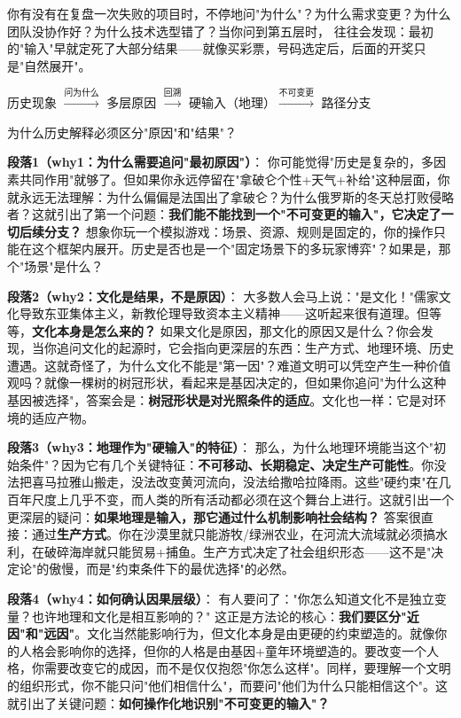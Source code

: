 \documentclass[../main.tex]{subfiles}
\begin{document}
	\begin{motivation}
				你有没有在复盘一次失败的项目时，不停地问"为什么"？为什么需求变更？为什么团队没协作好？为什么技术选型错了？当你问到第五层时，
		往往会发现：最初的"输入"早就定死了大部分结果——就像买彩票，号码选定后，后面的开奖只是"自然展开"。
	\end{motivation}
	
	\begin{logicmap}
		历史现象 $\xrightarrow{\text{问为什么}}$ 多层原因 $\xrightarrow{\text{回溯}}$ 硬输入（地理）$\xrightarrow{\text{不可变更}}$ 路径分支
	\end{logicmap}
	
	\begin{questionbox}
		为什么历史解释必须区分"原因"和"结果"？
	\end{questionbox}
	
	\textbf{段落1（why1：为什么需要追问"最初原因"）}：  
	你可能觉得"历史是复杂的，多因素共同作用"就够了。但如果你永远停留在"拿破仑个性+天气+补给"这种层面，你就永远无法理解：为什么偏偏是法国出了拿破仑？为什么俄罗斯的冬天总打败侵略者？这就引出了第一个问题：\textbf{我们能不能找到一个"不可变更的输入"，它决定了一切后续分支？} 想象你玩一个模拟游戏：场景、资源、规则是固定的，你的操作只能在这个框架内展开。历史是否也是一个"固定场景下的多玩家博弈"？如果是，那个"场景"是什么？
	
	\textbf{段落2（why2：文化是结果，不是原因）}：  
	大多数人会马上说："是文化！"儒家文化导致东亚集体主义，新教伦理导致资本主义精神——这听起来很有道理。但等等，\textbf{文化本身是怎么来的？} 如果文化是原因，那文化的原因又是什么？你会发现，当你追问文化的起源时，它会指向更深层的东西：生产方式、地理环境、历史遭遇。这就奇怪了，为什么文化不能是"第一因"？难道文明可以凭空产生一种价值观吗？就像一棵树的树冠形状，看起来是基因决定的，但如果你追问"为什么这种基因被选择"，答案会是：\textbf{树冠形状是对光照条件的适应}。文化也一样：它是对环境的适应产物。
	
	\textbf{段落3（why3：地理作为"硬输入"的特征）}：  
	那么，为什么地理环境能当这个"初始条件"？因为它有几个关键特征：\textbf{不可移动、长期稳定、决定生产可能性}。你没法把喜马拉雅山搬走，没法改变黄河流向，没法给撒哈拉降雨。这些"硬约束"在几百年尺度上几乎不变，而人类的所有活动都必须在这个舞台上进行。这就引出一个更深层的疑问：\textbf{如果地理是输入，那它通过什么机制影响社会结构？} 答案很直接：通过\textbf{生产方式}。你在沙漠里就只能游牧/绿洲农业，在河流大流域就必须搞水利，在破碎海岸就只能贸易+捕鱼。生产方式决定了社会组织形态——这不是"决定论"的傲慢，而是"约束条件下的最优选择"的必然。
	
	\textbf{段落4（why4：如何确认因果层级）}：  
	有人要问了："你怎么知道文化不是独立变量？也许地理和文化是相互影响的？" 这正是方法论的核心：\textbf{我们要区分"近因"和"远因"}。文化当然能影响行为，但文化本身是由更硬的约束塑造的。就像你的人格会影响你的选择，但你的人格是由基因+童年环境塑造的。要改变一个人格，你需要改变它的成因，而不是仅仅抱怨"你怎么这样"。同样，要理解一个文明的组织形式，你不能只问"他们相信什么"，而要问"他们为什么只能相信这个"。这就引出了关键问题：\textbf{如何操作化地识别"不可变更的输入"？}
	
\end{document}
